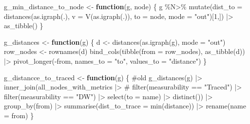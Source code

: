 \documentclass[
  letterpaper,
  DIV=11,
  numbers=noendperiod]{scrartcl}
\newenvironment{Shaded}{\begin{snugshade}}{\end{snugshade}}
\newcommand{\AttributeTok}[1]{\textcolor[rgb]{0.40,0.45,0.13}{#1}}
\newcommand{\CommentTok}[1]{\textcolor[rgb]{0.37,0.37,0.37}{#1}}
\newcommand{\ControlFlowTok}[1]{\textcolor[rgb]{0.00,0.23,0.31}{\textbf{#1}}}
\newcommand{\DecValTok}[1]{\textcolor[rgb]{0.68,0.00,0.00}{#1}}
\newcommand{\FunctionTok}[1]{\textcolor[rgb]{0.28,0.35,0.67}{#1}}
\newcommand{\NormalTok}[1]{\textcolor[rgb]{0.00,0.23,0.31}{#1}}
\newcommand{\OtherTok}[1]{\textcolor[rgb]{0.00,0.23,0.31}{#1}}
\newcommand{\SpecialCharTok}[1]{\textcolor[rgb]{0.37,0.37,0.37}{#1}}
\newcommand{\StringTok}[1]{\textcolor[rgb]{0.13,0.47,0.30}{#1}}
\begin{document}
\begin{Shaded}
\begin{Highlighting}[]
\NormalTok{g\_min\_distance\_to\_node }\OtherTok{\textless{}{-}} \ControlFlowTok{function}\NormalTok{(g, node) \{}
\NormalTok{    g }\SpecialCharTok{\%N\textgreater{}\%}
        \FunctionTok{mutate}\NormalTok{(}\AttributeTok{dist\_to =} \FunctionTok{distances}\NormalTok{(}\FunctionTok{as.igraph}\NormalTok{(.), }
                                   \AttributeTok{v =} \FunctionTok{V}\NormalTok{(}\FunctionTok{as.igraph}\NormalTok{(.)), }
                                 \AttributeTok{to =}\NormalTok{ node, }
                                 \AttributeTok{mode =} \StringTok{"out"}\NormalTok{)[}\DecValTok{1}\NormalTok{,]) }\SpecialCharTok{|\textgreater{}} 
        \FunctionTok{as\_tibble}\NormalTok{()}
\NormalTok{\}}

\NormalTok{g\_distances }\OtherTok{\textless{}{-}} \ControlFlowTok{function}\NormalTok{(g) \{}
\NormalTok{    d }\OtherTok{\textless{}{-}} 
        \FunctionTok{distances}\NormalTok{(}\FunctionTok{as.igraph}\NormalTok{(g), }\AttributeTok{mode =} \StringTok{"out"}\NormalTok{)}
\NormalTok{    row\_nodes }\OtherTok{\textless{}{-}} \FunctionTok{rownames}\NormalTok{(d)}
    \FunctionTok{bind\_cols}\NormalTok{(}\FunctionTok{tibble}\NormalTok{(}\AttributeTok{from =}\NormalTok{ row\_nodes),}
              \FunctionTok{as\_tibble}\NormalTok{(d)) }\SpecialCharTok{|\textgreater{}} 
        \FunctionTok{pivot\_longer}\NormalTok{(}\SpecialCharTok{{-}}\NormalTok{from, }\AttributeTok{names\_to =} \StringTok{"to"}\NormalTok{, }\AttributeTok{values\_to =} \StringTok{"distance"}\NormalTok{)}
\NormalTok{\}}

\NormalTok{g\_distancce\_to\_traced }\OtherTok{\textless{}{-}} \ControlFlowTok{function}\NormalTok{(g) \{ }\CommentTok{\#old}
    \FunctionTok{g\_distances}\NormalTok{(g) }\SpecialCharTok{|\textgreater{}} 
        \FunctionTok{inner\_join}\NormalTok{(all\_nodes\_with\_metrics }\SpecialCharTok{|\textgreater{}} 
                       \CommentTok{\# filter(measurability == "Traced") |\textgreater{} }
                       \FunctionTok{filter}\NormalTok{(measurability }\SpecialCharTok{==} \StringTok{"DW"}\NormalTok{) }\SpecialCharTok{|\textgreater{}} 
                       \FunctionTok{select}\NormalTok{(}\AttributeTok{to =}\NormalTok{ name) }\SpecialCharTok{|\textgreater{}} 
                       \FunctionTok{distinct}\NormalTok{()) }\SpecialCharTok{|\textgreater{}} 
        \FunctionTok{group\_by}\NormalTok{(from) }\SpecialCharTok{|\textgreater{}} 
        \FunctionTok{summarise}\NormalTok{(}\AttributeTok{dist\_to\_trace =} \FunctionTok{min}\NormalTok{(distance)) }\SpecialCharTok{|\textgreater{}} 
        \FunctionTok{rename}\NormalTok{(}\AttributeTok{name =}\NormalTok{ from)}
\NormalTok{\}}


\end{Highlighting}
\end{Shaded}
\end{document}
